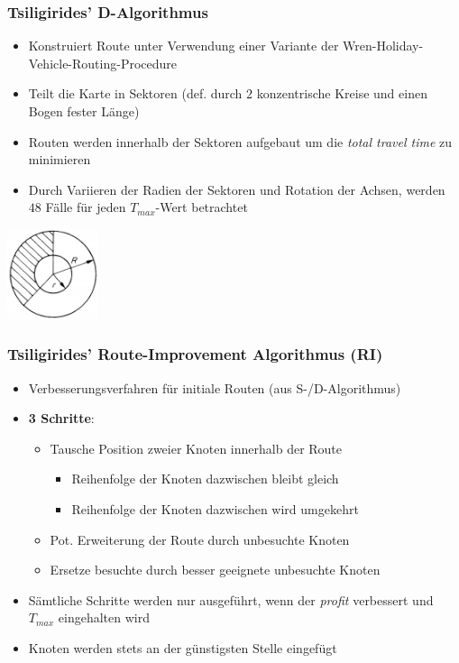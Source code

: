 \documentclass{beamer}
\begin{document}
\begin{frame}
  \frametitle{Tsiligirides' D-Algorithmus}
  \begin{itemize}
    \item Konstruiert Route unter Verwendung einer Variante der Wren-Holiday-Vehicle-Routing-Procedure
    \item Teilt die Karte in Sektoren (def. durch $2$ konzentrische Kreise und einen Bogen fester Länge)
    \item Routen werden innerhalb der Sektoren aufgebaut um die \textit{total travel time} zu minimieren
    \item Durch Variieren der Radien der Sektoren und Rotation der Achsen, werden $48$ Fälle für jeden $T_{max}$-Wert betrachtet
  \end{itemize}
  \includegraphics[width=0.2\textwidth]{img/d_algo.png}
\end{frame}

\begin{frame}
  \frametitle{Tsiligirides' Route-Improvement Algorithmus (RI)}
  \begin{itemize}
    \item Verbesserungsverfahren für initiale Routen (aus S-/D-Algorithmus)
    \item \textbf{3 Schritte}:
    \begin{itemize}
      \item Tausche Position zweier Knoten innerhalb der Route
      \begin{itemize}
        \item Reihenfolge der Knoten dazwischen bleibt gleich
        \item Reihenfolge der Knoten dazwischen wird umgekehrt
      \end{itemize}
      \item Pot. Erweiterung der Route durch unbesuchte Knoten
      \item Ersetze besuchte durch besser geeignete unbesuchte Knoten
    \end{itemize}
    \item Sämtliche Schritte werden nur ausgeführt, wenn der \textit{profit} verbessert und $T_{max}$ eingehalten wird
    \item Knoten werden stets an der günstigsten Stelle eingefügt
  \end{itemize}
\end{frame}
\end{document}
